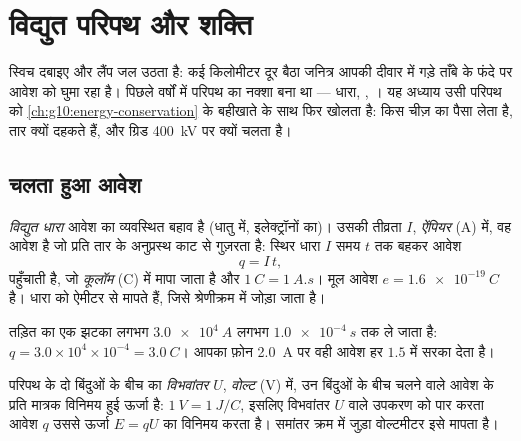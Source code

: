 \chapter{विद्युत परिपथ और शक्ति}\label{ch:g11:circuits-and-power}

स्विच दबाइए और लैंप जल उठता है: कई किलोमीटर दूर बैठा जनित्र आपकी दीवार में
गड़े ताँबे के फंदे पर आवेश को घुमा रहा है। पिछले वर्षों में परिपथ का नक्शा
बना था --- धारा, , । यह अध्याय उसी परिपथ को
\cref{ch:g10:energy-conservation} के बहीखाते के साथ फिर खोलता है:  किस चीज़ का पैसा लेता है,
 तार क्यों दहकते हैं, और ग्रिड \qty{400}{kV} पर क्यों चलता है।

\section{चलता हुआ आवेश}

\begin{definition}[धारा और कूलॉम]\label{def:g11:circuits-and-power:current}
\emph{विद्युत धारा} आवेश का व्यवस्थित बहाव है (धातु में,
इलेक्ट्रॉनों का)। उसकी तीव्रता $I$, \emph{ऐंपियर} (\unit{A}) में,
वह आवेश है जो प्रति  तार के अनुप्रस्थ काट से गुज़रता है: स्थिर धारा
$I$ समय $t$ तक बहकर आवेश
\[ q = I\,t , \]
पहुँचाती है, जो \emph{कूलॉम} (\unit{C}) में मापा जाता है और
$\qty{1}{C} =
\qty{1}{A.s}$। मूल आवेश $e = \qty{1.6e-19}{C}$ है। धारा को ऐमीटर से मापते हैं, जिसे श्रेणीक्रम में
जोड़ा जाता है।
\end{definition}

\begin{example}[तड़ित बनाम फ़ोन]\label{ex:g11:circuits-and-power:coulomb}
तड़ित का एक झटका लगभग $\qty{3.0e4}{A}$ लगभग $\qty{1.0e-4}{s}$ तक ले जाता है: $q = 3.0\times10^{4} \times 10^{-4} = \qty{3.0}{C}$।
आपका फ़ोन \qty{2.0}{A} पर वही आवेश हर $1.5$  में सरका देता है।
\end{example}

\begin{definition}[विभवांतर और वोल्ट]\label{def:g11:circuits-and-power:voltage}
परिपथ के दो बिंदुओं के बीच का \emph{विभवांतर} $U$,
\emph{वोल्ट} (\unit{V}) में, उन बिंदुओं के बीच चलने वाले आवेश के
प्रति मात्रक विनिमय हुई ऊर्जा है: $\qty{1}{V} = \qty{1}{J/C}$, इसलिए विभवांतर
$U$ वाले उपकरण को पार करता आवेश $q$ उससे ऊर्जा $E = qU$ का विनिमय
करता है। समांतर क्रम में जुड़ा वोल्टमीटर इसे मापता है।
\end{definition}

